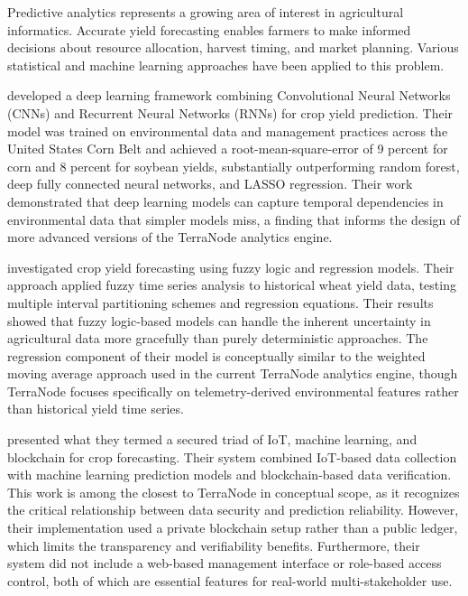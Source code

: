 Predictive analytics represents a growing area of interest in agricultural informatics. Accurate yield forecasting enables farmers to make informed decisions about resource allocation, harvest timing, and market planning. Various statistical and machine learning approaches have been applied to this problem.

\textcite{khaki2019cnn} developed a deep learning framework combining Convolutional Neural Networks (CNNs) and Recurrent Neural Networks (RNNs) for crop yield prediction. Their model was trained on environmental data and management practices across the United States Corn Belt and achieved a root-mean-square-error of 9 percent for corn and 8 percent for soybean yields, substantially outperforming random forest, deep fully connected neural networks, and LASSO regression. Their work demonstrated that deep learning models can capture temporal dependencies in environmental data that simpler models miss, a finding that informs the design of more advanced versions of the TerraNode analytics engine.

\textcite{garg2018crop} investigated crop yield forecasting using fuzzy logic and regression models. Their approach applied fuzzy time series analysis to historical wheat yield data, testing multiple interval partitioning schemes and regression equations. Their results showed that fuzzy logic-based models can handle the inherent uncertainty in agricultural data more gracefully than purely deterministic approaches. The regression component of their model is conceptually similar to the weighted moving average approach used in the current TerraNode analytics engine, though TerraNode focuses specifically on telemetry-derived environmental features rather than historical yield time series.

\textcite{layek2025secured} presented what they termed a secured triad of IoT, machine learning, and blockchain for crop forecasting. Their system combined IoT-based data collection with machine learning prediction models and blockchain-based data verification. This work is among the closest to TerraNode in conceptual scope, as it recognizes the critical relationship between data security and prediction reliability. However, their implementation used a private blockchain setup rather than a public ledger, which limits the transparency and verifiability benefits. Furthermore, their system did not include a web-based management interface or role-based access control, both of which are essential features for real-world multi-stakeholder use.

